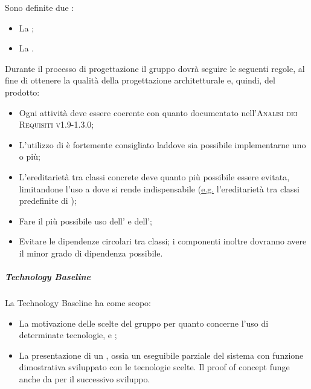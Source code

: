 \documentclass[../norme-di-progetto.tex]{subfiles}
\begin{document}
Sono definite due :
\begin{itemize}
  \item La \textbf{};
  \item La \textbf{}.
\end{itemize}

Durante il processo di progettazione il gruppo dovrà seguire le seguenti regole, al fine di ottenere la qualità della progettazione architetturale e, quindi, del prodotto:
\begin{itemize}
  \item Ogni attività deve essere coerente con quanto documentato nell'\textsc{Analisi dei Requisiti v1.9-1.3.0};
  \item L'utilizzo di  è fortemente consigliato laddove sia possibile implementarne uno o più;
  \item L'ereditarietà tra classi concrete deve quanto più possibile essere evitata, limitandone l'uso a dove si rende indispensabile (\underline{e.g.} l'ereditarietà tra classi predefinite di );
  \item Fare il più possibile uso dell' e dell';
  \item Evitare le dipendenze circolari tra classi; i componenti inoltre dovranno avere il minor grado di dipendenza possibile.
\end{itemize}

\subparagraph*{Technology Baseline}
La Technology Baseline ha come scopo:
\begin{itemize}
  \item La motivazione delle scelte del gruppo per quanto concerne l'uso di determinate tecnologie,  e ;
  \item La presentazione di un , ossia un eseguibile parziale del sistema con funzione dimostrativa sviluppato con le tecnologie scelte. Il proof of concept funge anche da  per il successivo sviluppo.
\end{itemize}
\end{document}
